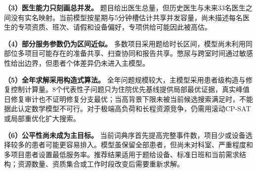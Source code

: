 \textbf{（3）医生能力只刻画总并发。} 题目给出医生总量，但历史医生与未来33名医生之间没有实名映射。当前模型按星期与5分钟槽估计共享并发容量，尚未描述每名医生的专项资质、班次、请假和设备偏好，专项供给可能因此被高估。

\textbf{（4）部分服务参数仍为区间近似。} 多数项目采用题给时长区间，模型尚未利用同部位多项目可能存在的准备共享、扫查协同和报告共享。憋尿与跨室时间通过敏感性给出边界，但患者个体差异仍未进入主模型。

\textbf{（5）全年求解采用构造式算法。} 全年问题规模较大，主模型采用患者级构造与修复控制计算量。8个代表性子问题只为住院优先基线提供局部最优证据，真实峰值日修复审计也不证明修复分支最优；当高背景下限未被当前候选搜索满足时，不能据此认定数学模型不可行。对于极端高负荷和长程资源竞争，仍需用滚动CP-SAT或局部重优化扩大搜索。

\textbf{（6）公平性尚未成为主目标。} 当前词典序首先提高完整事件数，项目少或设备选择较多的患者可能更容易排入。模型虽保留全部患者，但尚未对科室、严重程度和多项目患者设置最低服务率。推荐结果适用于题给设备、标准日班和当前需求结构；资源数量、资质集合或工作时段改变后需要重新求解。
